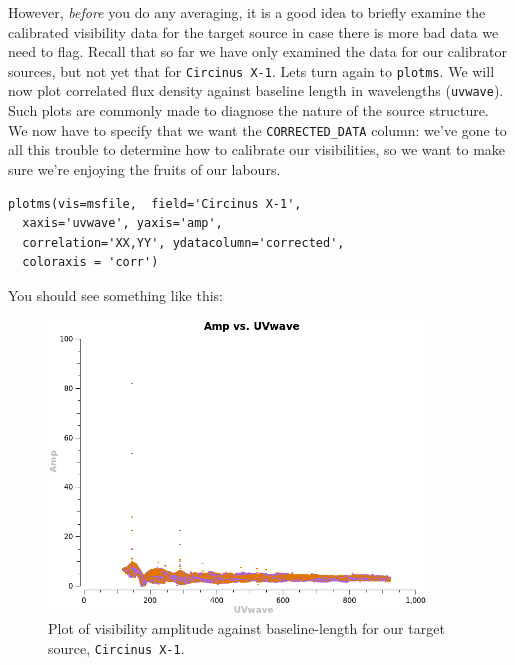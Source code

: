 \documentclass[force,almostfull,justified]{tufte-book}
\begin{document}
However, {\em before} you do any averaging, it is a good idea to briefly examine the calibrated
visibility data for the target source in case there is more bad data we need to flag.  Recall that so
far we have only examined the data for our calibrator sources, but not yet that for {\tt Circinus
X-1}.  Lets turn again to {\tt plotms}.  We will now plot correlated flux density against baseline
length in wavelengths ({\tt uvwave}).  Such plots are commonly made to diagnose the nature of the
source structure.  We now have to specify that we want the {\tt CORRECTED\_DATA} column: we've gone to
all this trouble to determine how to calibrate our visibilities, so we want to make sure we're
enjoying the fruits of our labours.

\begin{casacmd}
\begin{verbatim}
plotms(vis=msfile,  field='Circinus X-1',
  xaxis='uvwave', yaxis='amp',
  correlation='XX,YY', ydatacolumn='corrected',
  coloraxis = 'corr')
\end{verbatim}
\end{casacmd}

You should see something like this:
\begin{figure}
  \includegraphics[width=10cm]{images/CirX1_uvplot}
  \caption[Mind map.]{Plot of visibility amplitude against
    baseline-length for our target source, {\tt Circinus X-1}.}
  \forceversofloat
  \label{fig:CygX1_upvlot}
\end{figure}
\end{document}
